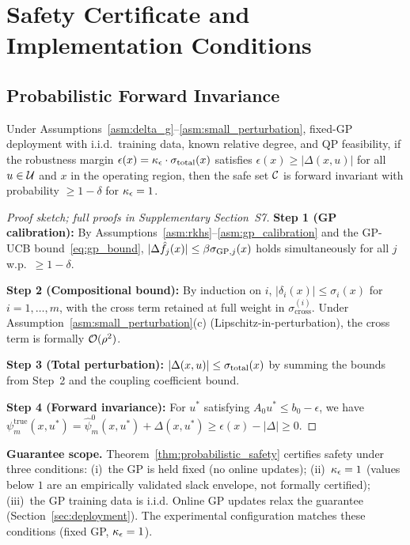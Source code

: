 \section{Safety Certificate and Implementation Conditions}
\label{sec:safety_certificate}

\subsection{Probabilistic Forward Invariance}

\begin{theorem}
\label{thm:probabilistic_safety}
Under Assumptions~\ref{asm:delta_g}--\ref{asm:small_perturbation}, fixed-GP deployment with i.i.d.\ training data, known relative degree, and QP feasibility, if the robustness margin $\epsilon(x) = \kappa_\epsilon \cdot \sigma_{\mathrm{total}}(x)$ satisfies $\epsilon(x) \geq |\Delta(x,u)|$ for all $u \in \mathcal{U}$ and $x$ in the operating region, then the safe set $\mathcal{C}$ is forward invariant with probability $\geq 1 - \delta$ for $\kappa_\epsilon = 1$.
\end{theorem}

\begin{proof}[Proof sketch; full proofs in Supplementary Section~S7]
\textbf{Step 1 (GP calibration):} By Assumptions~\ref{asm:rkhs}--\ref{asm:gp_calibration} and the GP-UCB bound~\eqref{eq:gp_bound}, $|\Delta \hat{f}_j(x)| \leq \beta \sigma_{\mathrm{GP},j}(x)$ holds simultaneously for all $j$ w.p.\ $\geq 1-\delta$.

\textbf{Step 2 (Compositional bound):} By induction on $i$, $|\delta_i(x)| \leq \sigma_i(x)$ for $i=1,\ldots,m$, with the cross term retained at full weight in $\sigma_{\mathrm{cross}}^{(i)}$. Under Assumption~\ref{asm:small_perturbation}(c) (Lipschitz-in-perturbation), the cross term is formally $\mathcal{O}(\rho^2)$.

\textbf{Step 3 (Total perturbation):} $|\Delta(x,u)| \leq \sigma_{\mathrm{total}}(x)$ by summing the bounds from Step~2 and the coupling coefficient bound.

\textbf{Step 4 (Forward invariance):} For $u^*$ satisfying $A_0 u^* \leq b_0 - \epsilon$, we have $\psi_m^{\mathrm{true}}(x,u^*) = \hat{\psi}_m^0(x,u^*) + \Delta(x,u^*) \geq \epsilon(x) - |\Delta| \geq 0$.
\end{proof}

\textbf{Guarantee scope.} Theorem~\ref{thm:probabilistic_safety} certifies safety under three conditions: (i)~the GP is held fixed (no online updates); (ii)~$\kappa_\epsilon = 1$ (values below $1$ are an empirically validated slack envelope, not formally certified); (iii)~the GP training data is i.i.d. Online GP updates relax the guarantee (Section~\ref{sec:deployment}). The experimental configuration matches these conditions (fixed GP, $\kappa_\epsilon = 1$).

